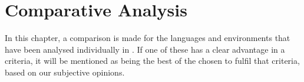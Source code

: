 \chapter{Comparative Analysis}
\label{chap:comparative_analysis}

In this chapter, a comparison is made for the languages and environments that have been analysed individually in . If one of these has a clear advantage in a criteria, it will be mentioned as being the best of the chosen to fulfil that criteria, based on our subjective opinions.










